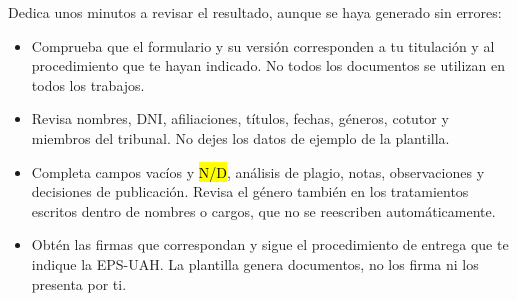 \documentclass[10pt,a4paper]{article}
\begin{document}
\begin{minipage}{\linewidth}
Dedica unos minutos a revisar el resultado, aunque se haya generado sin errores:
\begin{itemize}
  \item Comprueba que el formulario y su versión corresponden a tu titulación y al procedimiento que te hayan indicado. No todos los documentos se utilizan en todos los trabajos.
  \item Revisa nombres, DNI, afiliaciones, títulos, fechas, géneros, cotutor y miembros del tribunal. No dejes los datos de ejemplo de la plantilla.
  \item Completa campos vacíos y \hl{N/D}, análisis de plagio, notas, observaciones y decisiones de publicación. Revisa el género también en los tratamientos escritos dentro de nombres o cargos, que no se reescriben automáticamente.
  \item Obtén las firmas que correspondan y sigue el procedimiento de entrega que te indique la EPS-UAH. La plantilla genera documentos, no los firma ni los presenta por ti.
\end{itemize}
\end{minipage}
\end{document}
